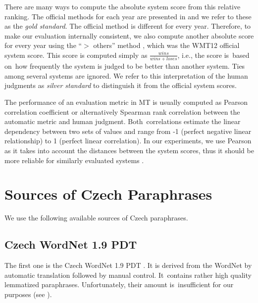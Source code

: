 There are many ways to compute the absolute system score from this relative
ranking. The official methods for each year are presented in  
and we refer to these as the \textit{gold standard}. The official method is
different for every year. Therefore, to make our evaluation internally 
consistent, we also compute another absolute score for every year using the 
“$ >$ others” method \cite{bojar-grains}, which was the WMT12 official system
score. This score is computed simply as $\frac{wins}{wins+loses} $, i.e., the 
score is~based on~how frequently the system is judged to be better than 
another system. Ties among several systems are ignored. We refer to this 
interpretation of the human judgments as \textit{silver standard} to distinguish
it from the official system scores.

The performance of an evaluation metric in MT is usually computed as Pearson 
correlation coefficient or alternatively Spearman rank correlation between the 
automatic metric and human judgment. Both~correlations estimate the linear 
dependency between two sets of values and range from -1 (perfect negative 
linear relationship) to 1 (perfect linear correlation). In our experiments, we use
Pearson as it takes into account the distances between the system scores, thus 
it should be more reliable for similarly evaluated systems 
\citep{machacek-bojar-2014-results}.

\section{Sources of Czech Paraphrases}
We use the following available sources of Czech paraphrases.

\subsection{Czech WordNet 1.9 PDT}
The first one is the Czech WordNet 1.9 PDT \citep{czech-wordnet}. It is derived 
from the WordNet \cite{wordnet} by automatic translation followed by manual 
control. It~contains rather high quality lemmatized paraphrases. Unfortunately, 
their amount is~insufficient for our purposes (see ). 


